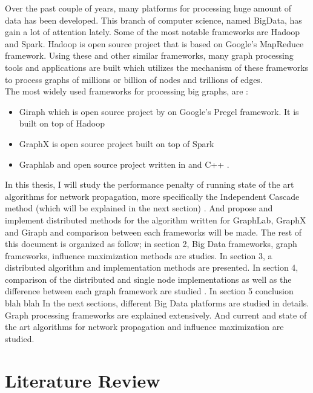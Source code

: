 \documentclass[english]{tktltiki}
\begin{document}
Over the past couple of years, many platforms for processing huge amount of data has been developed. This branch of computer science, named BigData, has gain a lot of attention lately. Some of the most notable frameworks are Hadoop and Spark. Hadoop is open source project that is based on Google's MapReduce framework. 
Using these and other similar frameworks, many graph processing tools and applications are built which utilizes the mechanism of these frameworks to process graphs of millions or billion of nodes and trillions of edges. \\
The most widely used frameworks for processing big graphs, are :
\begin{itemize}
\item 
Giraph which is open source project by on Google's Pregel framework. It is built on top of Hadoop
\item 
GraphX is open source project built on top of Spark
\item
Graphlab and open source project written in  and C++ . 
\end{itemize}

In this thesis, I will study the performance penalty of running state of the art algorithms for network propagation, more specifically the Independent Cascade method (which will be explained in the next section) . And propose and implement distributed methods for the algorithm written for GraphLab, GraphX and Giraph and comparison between each frameworks will be made. 
The rest of this document is organized as follow; in section 2, Big Data frameworks, graph frameworks, influence maximization methods are studies. In section 3, a distributed algorithm and implementation methods are presented. In section 4, comparison of the distributed and single node implementations as well as the difference between each graph framework are studied . In section 5 conclusion blah blah
In the next sections, different Big Data platforms are studied in details. Graph processing frameworks are explained extensively. And current and state of the art algorithms for network propagation and influence maximization are studied. 




\section{Literature Review}
\end{document}
